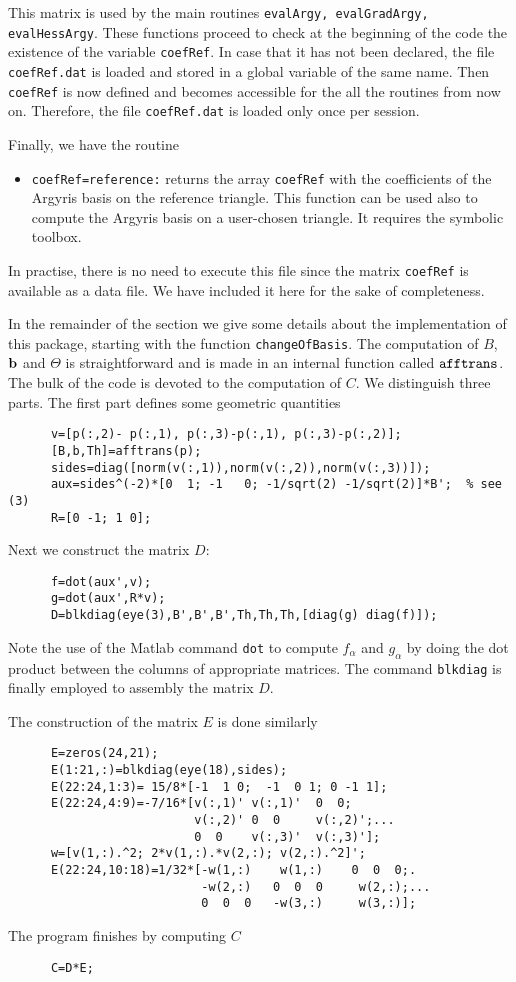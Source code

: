 \documentclass[a4paper,12pt]{article}
\begin{document}
This matrix is used by the main routines {\tt evalArgy,
evalGradArgy, evalHessArgy}. These functions proceed to check at the
beginning of the code the existence of the variable {\tt coefRef}.
In case that it has not been declared, the file {\tt coefRef.dat} is
loaded and stored in a global variable of the same name. Then {\tt
coefRef} is now defined and becomes accessible for the all the
routines from now on. Therefore, the file {\tt coefRef.dat} is loaded
only once per session.

Finally, we have the routine
\begin{itemize}
\item {\tt coefRef=reference:}  returns the  array {\tt coefRef} with
the coefficients of the Argyris basis on the reference triangle.
This function can be used also to compute the Argyris basis on a
user-chosen triangle. It requires the symbolic toolbox.
\end{itemize}
In practise, there is no need to execute this file since the matrix
{\tt coefRef} is available as a data file. We have included it here
for the sake of completeness.

 In the remainder of the section we give some
details about the implementation of this package, starting with the
function {\tt changeOfBasis}. The computation of $B$, ${\bf b}$ and
$\Theta$ is straightforward and is made in an internal function
called ${\tt afftrans}$. The bulk of the code  is devoted to the
computation of $C$. We distinguish three parts. The first part
defines some geometric quantities
\begin{verbatim}
      v=[p(:,2)- p(:,1), p(:,3)-p(:,1), p(:,3)-p(:,2)];
      [B,b,Th]=afftrans(p);
      sides=diag([norm(v(:,1)),norm(v(:,2)),norm(v(:,3))]);
      aux=sides^(-2)*[0  1; -1   0; -1/sqrt(2) -1/sqrt(2)]*B';  % see (3)
      R=[0 -1; 1 0];
\end{verbatim}
Next we construct the matrix $D$:
\begin{verbatim}
      f=dot(aux',v);
      g=dot(aux',R*v);
      D=blkdiag(eye(3),B',B',B',Th,Th,Th,[diag(g) diag(f)]);
\end{verbatim}
Note the use of the Matlab command {\tt dot} to compute $f_\alpha$
and $g_\alpha$ by doing the dot product between the columns of
appropriate matrices. The command {\tt blkdiag}
is finally employed to assembly the matrix $D$.

The construction of the  matrix $E$ is done similarly
\begin{verbatim}
      E=zeros(24,21);
      E(1:21,:)=blkdiag(eye(18),sides);
      E(22:24,1:3)= 15/8*[-1  1 0;  -1  0 1; 0 -1 1];
      E(22:24,4:9)=-7/16*[v(:,1)' v(:,1)'  0  0;
                          v(:,2)' 0  0     v(:,2)';...
                          0  0    v(:,3)'  v(:,3)'];
      w=[v(1,:).^2; 2*v(1,:).*v(2,:); v(2,:).^2]';
      E(22:24,10:18)=1/32*[-w(1,:)    w(1,:)    0  0  0;.
                           -w(2,:)   0  0  0     w(2,:);...
                           0  0  0   -w(3,:)     w(3,:)];
\end{verbatim}
The program finishes by  computing $C$
\begin{verbatim}
      C=D*E;
\end{verbatim}
\end{document}
